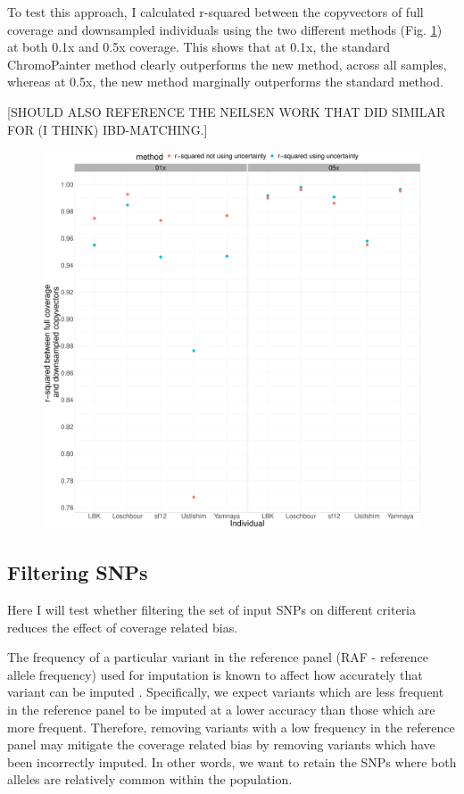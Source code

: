 To test this approach, I calculated r-squared between the copyvectors of full coverage and downsampled individuals using the two different methods (Fig. \ref{fig:uncertainty_v_noUncertainty_0.5x_0.1x}) at both 0.1x and 0.5x coverage. This shows that at 0.1x, the standard ChromoPainter method clearly outperforms the new method, across all samples, whereas at 0.5x, the new method marginally outperforms the standard method. 

{\color{red}[SHOULD ALSO REFERENCE THE NEILSEN WORK THAT DID SIMILAR FOR (I THINK) IBD-MATCHING.]}


\begin{figure}[htp]
    \centering
    \includegraphics[width=1.0\textwidth]{../images/chapter1/uncertainty_v_noUncertainty_0.5x_0.1x.pdf}
    \caption{}
    \label{fig:uncertainty_v_noUncertainty_0.5x_0.1x}
\end{figure}


\subsection{Filtering SNPs}

Here I will test whether filtering the set of input SNPs on different criteria reduces the effect of coverage related bias. 

The frequency of a particular variant in the reference panel (RAF - reference allele frequency) used for imputation is known to affect how accurately that variant can be imputed \cite{rubinacci2021efficient, delaneau2018integrative, Browning2016, hui2020evaluating}. Specifically, we expect variants which are less frequent in the reference panel to be imputed at a lower accuracy than those which are more frequent. Therefore, removing variants with a low frequency in the reference panel may mitigate the coverage related bias by removing variants which have been incorrectly imputed. In other words, we want to retain the SNPs where both alleles are relatively common within the population. 

